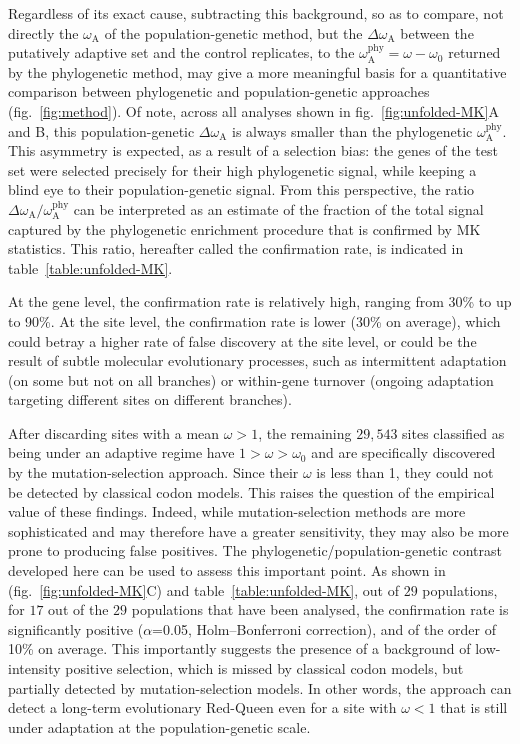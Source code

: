 \documentclass[9pt,twocolumn,twoside,lineno]{pnas-new}
\newcommand{\rateApop}{\omega_{\mathrm{A}}}
\newcommand{\rateAphy}{\rateApop^{\mathrm{phy}}}
\begin{document}
Regardless of its exact cause, subtracting this background, so as to compare, not directly the $\rateApop$ of the population-genetic method, but the $\Delta \rateApop$ between the putatively adaptive set and the control replicates, to the $\rateAphy= \omega - \omega_0$ returned by the phylogenetic method, may give a more meaningful basis for a quantitative comparison between phylogenetic and population-genetic approaches (fig.~\ref{fig:method}).
Of note, across all analyses shown in fig.~\ref{fig:unfolded-MK}A and B, this population-genetic $\Delta \rateApop$ is always smaller than the phylogenetic $\rateAphy$.
This asymmetry is expected, as a result of a selection bias: the genes of the test set were selected precisely for their high phylogenetic signal, while keeping a blind eye to their population-genetic signal.
From this perspective, the ratio $\Delta \rateApop /  \rateAphy$ can be interpreted as an estimate of the fraction of the total signal captured by the phylogenetic enrichment procedure that is confirmed by MK statistics.
This ratio, hereafter called the confirmation rate, is indicated in table~\ref{table:unfolded-MK}.

At the gene level, the confirmation rate is relatively high, ranging from 30\% to up to 90\%.
At the site level, the confirmation rate is lower (30\% on average), which could betray a higher rate of false discovery at the site level, or could be the result of subtle molecular evolutionary processes, such as intermittent adaptation (on some but not on all branches) or within-gene turnover (ongoing adaptation targeting different sites on different branches).

After discarding sites with a mean $\omega > 1$, the remaining $29,543$ sites classified as being under an adaptive regime have $1 > \omega > \omega_{0}$ and are specifically discovered by the mutation-selection approach.
Since their $\omega$ is less than 1, they could not be detected by classical codon models.
This raises the question of the empirical value of these findings.
Indeed, while mutation-selection methods are more sophisticated and may therefore have a greater sensitivity, they may also be more prone to producing false positives.
The phylogenetic/population-genetic contrast developed here can be used to assess this important point.
As shown in (fig.~\ref{fig:unfolded-MK}C) and table~\ref{table:unfolded-MK}, out of $29$ populations, for $17$ out of the $29$ populations that have been analysed, the confirmation rate is significantly positive ($\alpha$=0.05, Holm–Bonferroni correction), and of the order of 10\% on average.
This importantly suggests the presence of a background of low-intensity positive selection, which is missed by classical codon models, but partially detected by mutation-selection models.
In other words, the approach can detect a long-term evolutionary Red-Queen even for a site with $\omega < 1$ that is still under adaptation at the population-genetic scale.
\end{document}
